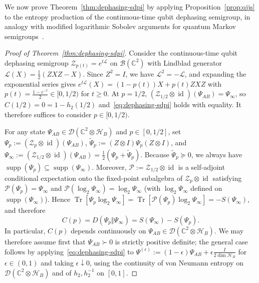 \documentclass[10pt,a4paper]{article}
\numberwithin{equation}{section}
\theoremstyle{plain}
\theoremstyle{definition}
\theoremstyle{remark}
\DeclareMathOperator{\Tr}{Tr}
\DeclareMathOperator{\supp}{supp}
\DeclareMathOperator{\id}{id}
\newcommand{\cH}{\mathcal{H}}
\newcommand{\cD}{\mathcal{D}}
\newcommand{\cB}{\mathcal{B}}
\newcommand{\cZ}{\mathcal{Z}}
\newcommand{\cL}{\mathcal{L}}
\newcommand{\cP}{\mathcal{P}}
\newcommand{\bC}{\mathbb{C}}
\begin{document}
We now prove Theorem~\ref{thm:dephasing-sdpi} by applying Proposition~\ref{prop:qjjs} to the entropy production of the continuous-time qubit dephasing semigroup, in analogy with modified logarithmic Sobolev arguments for quantum Markov semigroups~\cite{KastoryanoTemme2013,MullerHermesFrancaWolf2016}.

\begin{proof}[Proof of Theorem~\ref{thm:dephasing-sdpi}]
Consider the continuous-time qubit dephasing semigroup $\cZ_{p(t)} = e^{t\cL}$ on $\cB(\bC^2)$ with Lindblad generator $\cL(X) = \frac{1}{2}(ZXZ - X)$. Since $Z^2 = I$, we have $\cL^2 = -\cL$, and expanding the exponential series gives $e^{t\cL}(X) = (1 - p(t))X + p(t)ZXZ$ with $p(t) = \frac{1 - e^{-t}}{2} \in [0, 1/2)$ for $t \ge 0$. At $p = 1/2$, $(\cZ_{1/2} \otimes \id)(\Psi_{AB}) = \Psi_\infty$, so $C(1/2) = 0 = 1 - h_2(1/2)$ and~\eqref{eq:dephasing-sdpi} holds with equality. It therefore suffices to consider $p \in [0, 1/2)$.

For any state $\Psi_{AB} \in \cD(\bC^2 \otimes \cH_B)$ and $p \in [0, 1/2]$, set $\Psi_p := (\cZ_p \otimes \id)(\Psi_{AB})$, $\widetilde{\Psi}_p := (Z \otimes I)\Psi_p(Z \otimes I)$, and $\Psi_\infty := (\cZ_{1/2} \otimes \id)(\Psi_{AB}) = \frac{1}{2}(\Psi_p + \widetilde{\Psi}_p)$. Because $\widetilde{\Psi}_p \succeq 0$, we always have $\supp(\Psi_p) \subseteq \supp(\Psi_\infty)$. Moreover, $\cP := \cZ_{1/2} \otimes \id$ is a self-adjoint conditional expectation onto the fixed-point subalgebra of $\cZ_p \otimes \id$ satisfying $\cP(\Psi_p) = \Psi_\infty$ and $\cP(\log_2 \Psi_\infty) = \log_2 \Psi_\infty$ (with $\log_2 \Psi_\infty$ defined on $\supp(\Psi_\infty)$). Hence $\Tr[\Psi_p \log_2 \Psi_\infty] = \Tr[\cP(\Psi_p)\log_2 \Psi_\infty] = -S(\Psi_\infty)$, and therefore
\[
C(p) = D(\Psi_p \Vert \Psi_\infty) = S(\Psi_\infty) - S(\Psi_p).
\]
In particular, $C(p)$ depends continuously on $\Psi_{AB} \in \cD(\bC^2 \otimes \cH_B)$. We may therefore assume first that $\Psi_{AB} \succ 0$ is strictly positive definite; the general case follows by applying~\eqref{eq:dephasing-sdpi} to $\Psi^{(\epsilon)} := (1 - \epsilon)\Psi_{AB} + \epsilon \frac{I}{2\dim \cH_B}$ for $\epsilon \in (0,1)$ and taking $\epsilon \downarrow 0$, using the continuity of von Neumann entropy on $\cD(\bC^2 \otimes \cH_B)$ and of $h_2, h_2^{-1}$ on $[0,1]$.


\end{proof}
\end{document}
